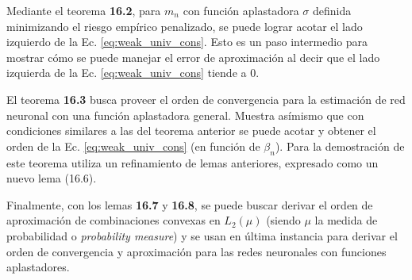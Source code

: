 \documentclass[12pt]{extarticle}
\newenvironment{comentarios_meta}
    {\begin{framed}\noindent\textcolor{red}{\textbf{\#}}}
    {\end{framed}}
\begin{document}
    Mediante el teorema \textbf{16.2}, para $m_n$ con función aplastadora $\sigma$ definida minimizando el riesgo empírico penalizado, se puede lograr acotar el lado izquierdo de la Ec. \ref{eq:weak_univ_cons}. Esto es un paso intermedio para mostrar cómo se puede manejar el error de aproximación al decir que el lado izquierda de la Ec. \ref{eq:weak_univ_cons} tiende a 0.
    
    El teorema \textbf{16.3} busca proveer el orden de convergencia para la estimación de red neuronal con una función aplastadora general. Muestra asímismo que con condiciones similares a las del teorema anterior se puede acotar y obtener el orden de la Ec. \ref{eq:weak_univ_cons} (en función de $\beta_n$). Para la demostración de este teorema utiliza un refinamiento de lemas anteriores, expresado como un nuevo lema (16.6).
    
    Finalmente, con los lemas \textbf{16.7} y \textbf{16.8}, se puede buscar derivar el orden de aproximación de combinaciones convexas en $L_2(\mu)$ (siendo $\mu$ la medida de probabilidad o \textit{probability measure}) y se usan en última instancia para derivar el orden de convergencia y aproximación para las redes neuronales con funciones aplastadores.
    
\end{document}
